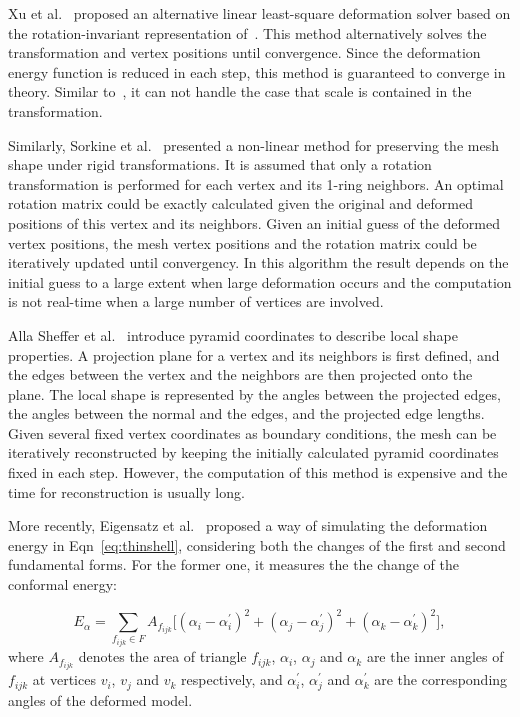 Xu et al.~\cite{XZYTPG07} proposed an alternative linear least-square deformation solver based on the rotation-invariant representation of~\cite{LSLC05}. This method alternatively solves the transformation and vertex positions until convergence. Since the deformation energy function is reduced in each step, this method is guaranteed to converge in theory. Similar to~\cite{LSLC05}, it can not handle the case that scale is contained in the transformation.

Similarly, Sorkine et al.~\cite{SA07} presented a non-linear method for preserving the mesh shape under rigid transformations. It is assumed that only a rotation transformation is performed for each vertex and its 1-ring neighbors. An optimal rotation matrix could be exactly calculated given the original and deformed positions of this vertex and its neighbors. Given an initial guess of the deformed vertex positions, the mesh vertex positions and the rotation matrix could be iteratively updated until convergency. In this algorithm the result depends on the initial guess to a large extent when large deformation occurs and the computation is not real-time when a large number of vertices are involved.

Alla Sheffer et al.~\cite{SK04} introduce pyramid coordinates to describe local shape properties. A projection plane for a vertex and its neighbors is first defined, and the edges between the vertex and the neighbors are then projected onto the plane. The local shape is represented by the angles between the projected edges, the angles between the normal and the edges, and the projected edge lengths. Given several fixed vertex coordinates as boundary conditions, the mesh can be iteratively reconstructed by keeping the initially calculated pyramid coordinates fixed in each step. However, the computation of this method is expensive and the time for reconstruction is usually long.

More recently, Eigensatz et al.~\cite{ESP08} proposed a way of simulating the deformation energy in Eqn~\ref{eq:thinshell}, considering both the changes of the first and second fundamental forms. For the former one, it measures the the change of the conformal energy:

\begin{equation}
\label{eq:conformalenergy}
E_{\alpha} = \sum\limits_{f_{ijk}\in F}{A_{f_{ijk}} \Big[(\alpha_i-\alpha_i^\prime)^2+(\alpha_j-\alpha_j^\prime)^2+(\alpha_k-\alpha_k^\prime)^2 \Big]},
\end{equation}
where $A_{f_{ijk}}$ denotes the area of triangle $f_{ijk}$, $\alpha_i$, $\alpha_j$ and $\alpha_k$ are the inner angles of $f_{ijk}$ at vertices $v_i$, $v_j$ and $v_k$ respectively, and $\alpha^\prime_i$, $\alpha^\prime_j$ and $\alpha^\prime_k$ are the corresponding angles of the deformed model.

